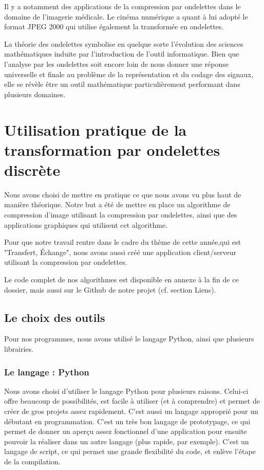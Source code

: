 \documentclass{article}
\begin{document}
Il y a notamment des applications de la compression par ondelettes dans le domaine de l’imagerie médicale. Le cinéma numérique a quant à lui adopté le format JPEG 2000 qui utilise également la transformée en ondelettes. 

La théorie des ondelettes symbolise en quelque sorte l’évolution des sciences mathématiques induite par l’introduction de l’outil informatique. 
Bien que l’analyse par les ondelettes soit encore loin de nous donner une réponse universelle et finale au problème de la représentation et du codage des signaux, elle se révèle être un outil mathématique particulièrement performant dans plusieurs domaines. 


\section{Utilisation pratique de la transformation par ondelettes discrète}

Nous avons choisi de mettre en pratique ce que nous avons vu plus haut
de manière théorique. Notre but a été de mettre en place un
algorithme de compression d'image utilisant la compression par
ondelettes, ainsi que des applications graphiques qui utilisent cet algorithme.

Pour que notre travail rentre dans le cadre du thème de cette année,qui est "Transfert, Échange", nous avons aussi créé une application client/serveur utilisant la compression par ondelettes.

Le code complet de nos algorithmes est disponible en annexe à la fin de ce dossier, mais aussi sur le Github de notre projet (cf. section Liens).



\subsection{Le choix des outils}

Pour nos programmes, nous avons utilisé le langage Python, ainsi que plusieurs librairies.

\subsubsection{Le langage : Python}

Nous avons choisi d'utiliser le langage Python pour plusieurs raisons. Celui-ci offre beaucoup de possibilités, est facile à utiliser (et à comprendre) et permet de créer de gros projets assez rapidement. C'est aussi un langage approprié pour un débutant en programmation. C'est un très bon langage de prototypage, ce qui permet de donner un aperçu assez fonctionnel d'une application pour ensuite pouvoir la réaliser dans un autre langage (plus rapide, par exemple). C'est un langage de script, ce qui permet une grande flexibilité du code, et enlève l'étape de la compilation.
\end{document}
